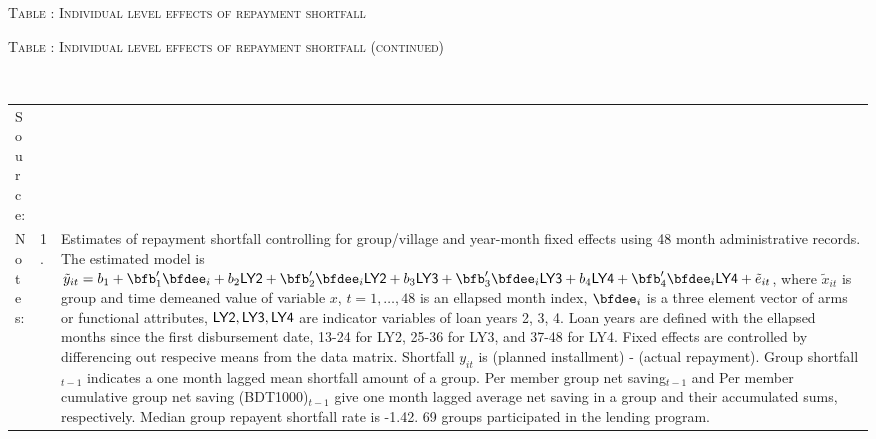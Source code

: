 \hspace{-1cm}\begin{minipage}[t]{14cm}
\hfil\textsc{\normalsize Table \thetable: Individual level effects of repayment shortfall\label{tab shortfall indiv o800}}\\
\setlength{\tabcolsep}{1pt}
\setlength{\baselineskip}{8pt}
\renewcommand{\arraystretch}{.6}
\hfil{}
\end{minipage}

\addtocounter{table}{-1}
\hspace{-1cm}\begin{minipage}[t]{14cm}
\hfil\textsc{\normalsize Table \thetable: Individual level effects of repayment shortfall (continued)\label{tab shortfall indiv o800 2}}\\
\setlength{\tabcolsep}{1pt}
\setlength{\baselineskip}{8pt}
\renewcommand{\arraystretch}{.6}
\hfil{}\\
\renewcommand{\arraystretch}{.8}
\setlength{\tabcolsep}{1pt}
\begin{tabular}{>{\hfill\scriptsize}p{1cm}<{}>{\hfill\scriptsize}p{.25cm}<{}>{\scriptsize}p{12cm}<{\hfill}}
Source:& \multicolumn{2}{l}{\scriptsize Estimated with GUK administrative data.}\\
Notes: & 1. & Estimates of repayment shortfall controlling for group/village and year-month fixed effects using 48 month administrative records. The estimated model is $\tilde{y}_{it}=b_{1}+\bfb'_{1}\bfdee_{i}+b_{2}\mbox{\textsf{LY2}}+\bfb'_{2}\bfdee_{i}\mbox{\textsf{LY2}}+b_{3}\mbox{\textsf{LY3}}+\bfb'_{3}\bfdee_{i}\mbox{\textsf{LY3}}+b_{4}\mbox{\textsf{LY4}}+\bfb'_{4}\bfdee_{i}\mbox{\textsf{LY4}}+\tilde{e}_{it}$, where $\tilde{x}_{it}$ is group and time demeaned value of variable $x$, $t=1,\dots, 48$ is an ellapsed month index, $\bfdee_{i}$ is a three element vector of arms or functional attributes, $\mbox{\textsf{LY2}}, \mbox{\textsf{LY3}}, \mbox{\textsf{LY4}}$ are indicator variables of loan years 2, 3, 4. Loan years are defined with the ellapsed months since the first disbursement date, 13-24 for \textsf{LY2}, 25-36 for \textsf{LY3}, and 37-48 for \textsf{LY4}. Fixed effects are controlled by differencing out respecive means from the data matrix. Shortfall $y_{it}$ is (planned installment) - (actual repayment). \textsf{Group shortfall}$_{t-1}$ indicates a one month lagged mean shortfall amount of a group. \textsf{Per member group net saving}$_{t-1}$ and \textsf{Per member cumulative group net saving (BDT1000)}$_{t-1}$ give one month lagged average net saving in a group and their accumulated sums, respectively. Median group repayent shortfall rate is -1.42. 69 groups participated in the lending program. \\

\end{tabular}
\end{minipage}
